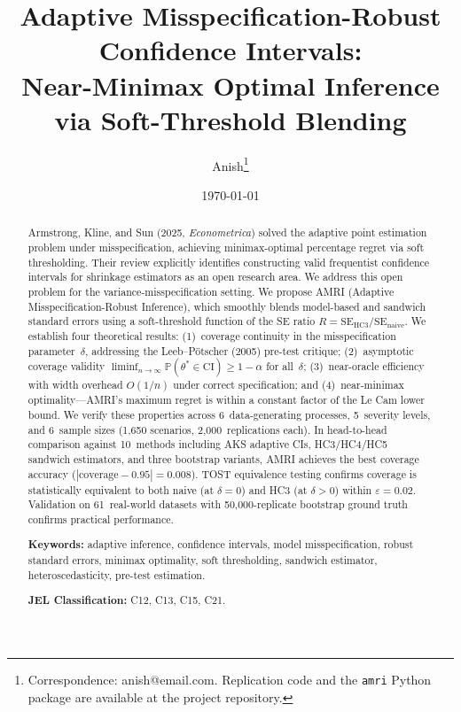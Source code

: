 \documentclass[12pt]{article}
\title{\textbf{Adaptive Misspecification-Robust Confidence Intervals:\\
Near-Minimax Optimal Inference via Soft-Threshold Blending}}
\author{Anish\thanks{Correspondence: anish@email.com.
Replication code and the \texttt{amri} Python package are available at the project repository.}}
\date{\today}
\theoremstyle{definition}
\theoremstyle{remark}
\newcommand{\Prob}{\mathbb{P}}
\newcommand{\se}{\mathrm{SE}}
\newcommand{\CI}{\mathrm{CI}}
\begin{document}
\maketitle

\begin{abstract}
\noindent
Armstrong, Kline, and Sun (2025, \textit{Econometrica}) solved the adaptive point estimation problem under misspecification, achieving minimax-optimal percentage regret via soft thresholding. Their review explicitly identifies constructing valid frequentist confidence intervals for shrinkage estimators as an open research area. We address this open problem for the variance-misspecification setting. We propose AMRI (Adaptive Misspecification-Robust Inference), which smoothly blends model-based and sandwich standard errors using a soft-threshold function of the SE ratio $R = \se_{\mathrm{HC3}}/\se_{\mathrm{naive}}$. We establish four theoretical results: (1)~coverage continuity in the misspecification parameter~$\delta$, addressing the Leeb--P\"otscher (2005) pre-test critique; (2)~asymptotic coverage validity $\liminf_{n\to\infty} \Prob(\theta^* \in \CI) \geq 1-\alpha$ for all~$\delta$; (3)~near-oracle efficiency with width overhead $O(1/n)$ under correct specification; and (4)~near-minimax optimality---AMRI's maximum regret is within a constant factor of the Le Cam lower bound. We verify these properties across 6~data-generating processes, 5~severity levels, and 6~sample sizes (1,650 scenarios, 2,000~replications each). In head-to-head comparison against 10~methods including AKS adaptive CIs, HC3/HC4/HC5 sandwich estimators, and three bootstrap variants, AMRI achieves the best coverage accuracy ($|\text{coverage} - 0.95| = 0.008$). TOST equivalence testing confirms coverage is statistically equivalent to both naive (at $\delta = 0$) and HC3 (at $\delta > 0$) within $\varepsilon = 0.02$. Validation on 61~real-world datasets with 50,000-replicate bootstrap ground truth confirms practical performance.

\medskip
\noindent\textbf{Keywords:} adaptive inference, confidence intervals, model misspecification, robust standard errors, minimax optimality, soft thresholding, sandwich estimator, heteroscedasticity, pre-test estimation.

\medskip
\noindent\textbf{JEL Classification:} C12, C13, C15, C21.
\end{abstract}
\end{document}
